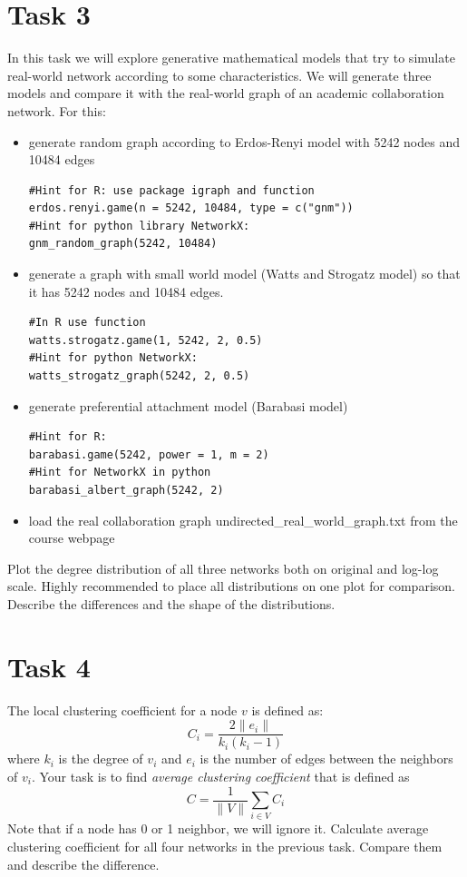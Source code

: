 \documentclass{article}
\begin{document}
\section*{Task 3}
In this task we will explore generative mathematical models that try to simulate real-world network according to some characteristics. We will generate three models and compare it with the real-world graph of an academic collaboration network. For this:
\begin{itemize}
\item generate random graph according to Erdos-Renyi model with 5242 nodes and 10484 edges 
\begin{lstlisting}
#Hint for R: use package igraph and function 
erdos.renyi.game(n = 5242, 10484, type = c("gnm"))
#Hint for python library NetworkX: 
gnm_random_graph(5242, 10484)
\end{lstlisting}
\item generate a graph with small world model (Watts and Strogatz model) so that it has 5242 nodes and 10484 edges. 
\begin{lstlisting}
#In R use function
watts.strogatz.game(1, 5242, 2, 0.5)
#Hint for python NetworkX: 
watts_strogatz_graph(5242, 2, 0.5)
\end{lstlisting}
\item generate preferential attachment model (Barabasi model)
\begin{lstlisting}
#Hint for R: 
barabasi.game(5242, power = 1, m = 2)
#Hint for NetworkX in python 
barabasi_albert_graph(5242, 2)
\end{lstlisting}
\item  load the real collaboration graph undirected\_real\_world\_graph.txt from the course webpage
\end{itemize}
Plot the degree distribution of all three networks both on original and log-log scale. Highly recommended to place all distributions on one plot for comparison. Describe the differences and the shape of the distributions.
 
\section*{Task 4}
The local clustering coefficient for a node $v$ is defined as:
$$C_i = \frac{2\|e_i\|}{k_i(k_i-1)}$$
where $k_i$ is the degree of $v_i$ and $e_i$ is the number of edges between the neighbors of $v_i$. Your task is to find \emph{average clustering coefficient} that is defined as 
$$C = \frac{1}{\|V\|}\sum_{i\in V}C_i$$
Note that if a node has 0 or 1 neighbor, we will ignore it.
Calculate average clustering coefficient for all four networks in the previous task. Compare them and describe the difference. 
\end{document}
